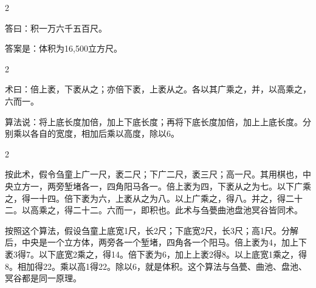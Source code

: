 \documentclass[11pt,a4paper]{article}
\begin{document}
\vspace{0.2cm}

\begin{paracol}{2}

\begin{answerbox}[\CJKfamily{rm}答 · 原文]
答曰：积一万六千五百尺。
\end{answerbox}

\switchcolumn

\begin{answerbox}[白话文：答案]
答案是：体积为16,500立方尺。
\end{answerbox}

\end{paracol}

\vspace{0.2cm}

\begin{paracol}{2}

\begin{methodbox}[\CJKfamily{rm}术 · 原文]
术曰：倍上袤，下袤从之；亦倍下袤，上袤从之。各以其广乘之，并，以高乘之，六而一。
\end{methodbox}

\switchcolumn

\begin{methodbox}
算法说：将上底长度加倍，加上下底长度；再将下底长度加倍，加上上底长度。分别乘以各自的宽度，相加后乘以高度，除以6。
\end{methodbox}

\end{paracol}

\vspace{0.2cm}

\begin{paracol}{2}

\begin{commentarybox}
按此术，假令刍童上广一尺，袤二尺；下广二尺，袤三尺；高一尺。其用棋也，中央立方一，两旁堑堵各一，四角阳马各一。倍上袤为四，下袤从之为七。以下广乘之，得一十四。倍下袤为六，上袤从之为八。以上广乘之，得八。并之，得二十二。以高乘之，得二十二。六而一，即积也。此术与刍甍曲池盘池冥谷皆同术。
\end{commentarybox}

\switchcolumn

\begin{commentarybox}
按照这个算法，假设刍童上底宽1尺，长2尺；下底宽2尺，长3尺；高1尺。分解后，中央是一个立方体，两旁各一个堑堵，四角各一个阳马。倍上袤为4，加上下袤3得7。以下底宽2乘之，得14。倍下袤为6，加上上袤2得8。以上底宽1乘之，得8。相加得22。乘以高1得22。除以6，就是体积。这个算法与刍甍、曲池、盘池、冥谷都是同一原理。
\end{commentarybox}

\end{paracol}
\end{document}
